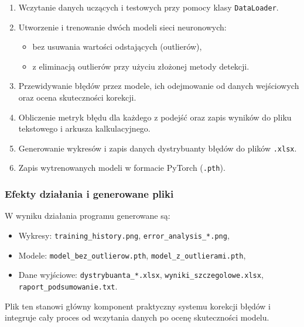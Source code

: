 \documentclass{classrep}
\begin{document}
\begin{enumerate}
	\item Wczytanie danych uczących i testowych przy pomocy klasy \texttt{DataLoader}.

	\item Utworzenie i trenowanie dwóch modeli sieci neuronowych:
	      \begin{itemize}
		      \item bez usuwania wartości odstających (outlierów),
		      \item z eliminacją outlierów przy użyciu złożonej metody detekcji.
	      \end{itemize}

	\item Przewidywanie błędów przez modele, ich odejmowanie od danych wejściowych oraz ocena skuteczności korekcji.

	\item Obliczenie metryk błędu dla każdego z podejść oraz zapis wyników do pliku tekstowego i arkusza kalkulacyjnego.

	\item Generowanie wykresów i zapis danych dystrybuanty błędów do plików \texttt{.xlsx}.

	\item Zapis wytrenowanych modeli w formacie PyTorch (\texttt{.pth}).
\end{enumerate}

\subsubsection*{Efekty działania i generowane pliki}

W wyniku działania programu generowane są:

\begin{itemize}
	\item Wykresy: \texttt{training\_history.png}, \texttt{error\_analysis\_*.png},
	\item Modele: \texttt{model\_bez\_outlierow.pth}, \texttt{model\_z\_outlierami.pth},
	\item Dane wyjściowe: \texttt{dystrybuanta\_*.xlsx}, \texttt{wyniki\_szczegolowe.xlsx}, \texttt{raport\_podsumowanie.txt}.
\end{itemize}

Plik ten stanowi główny komponent praktyczny systemu korekcji błędów i integruje cały proces od wczytania danych po ocenę skuteczności modelu.
\end{document}
